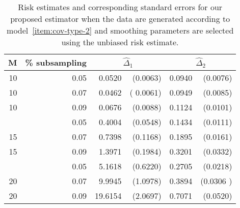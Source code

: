 \documentclass[12pt]{article}
\theoremstyle{definition}
\begin{document}

\begin{table}[H] \label{table:simulation-2-sigma-2}
\centering
\begin{tabular}{rrrrrr}
M & \% subsampling &  \multicolumn{2}{c}{$\hat{\Delta}_1$}  &  \multicolumn{2}{c}{$\hat{\Delta}_2$} \\ 
  \hline
10 & 0.05 & 0.0520 & (0.0063) & 0.0940 & (0.0076) \\ 
  10 & 0.07 & 0.0462 &( 0.0061) & 0.0949 & (0.0085) \\ 
  10 & 0.09 & 0.0676 & (0.0088) & 0.1124 & (0.0101)\\ 
    \hdashline
  15 & 0.05 & 0.4004 & (0.0548) & 0.1434 & (0.0111) \\ 
  15 & 0.07 & 0.7398 & (0.1168) & 0.1895 & (0.0161) \\ 
  15 & 0.09 & 1.3971 & (0.1984) & 0.3201 & (0.0332) \\ 
    \hdashline
  20 & 0.05 & 5.1618 & (0.6220) & 0.2705 & (0.0218)\\ 
  20 & 0.07 & 9.9945 & (1.0978) & 0.3894 & (0.0306 )\\ 
  20 & 0.09 & 19.6154 & (2.0697) & 0.7071 & (0.0520) \\ 
   \hline
\end{tabular}
\caption{Risk estimates and corresponding standard errors for our proposed estimator when the data are generated according to model~\ref{item:cov-type-2}  and smoothing parameters are selected using the unbiased risk estimate.} 
\end{table}
\end{document}
